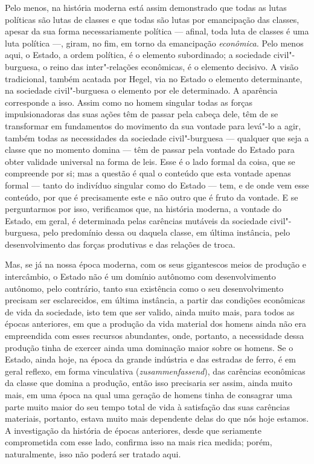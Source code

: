Pelo menos, na história moderna está assim demonstrado que todas as
lutas políticas são lutas de classes e que todas são lutas por
emancipação das classes, apesar da sua forma necessariamente política ---
afinal, toda luta de classes é uma luta política ---, giram, no fim, em
torno da emancipação \emph{econômica. }Pelo menos aqui, o Estado, a
ordem política, é o elemento subordinado; a sociedade civil"-burguesa, o
reino das inter"-relações econômicas, é o elemento decisivo. A visão
tradicional, também acatada por Hegel, via no Estado o elemento
determinante, na sociedade civil"-burguesa o elemento por ele
determinado. A aparência corresponde a isso. Assim como no homem
singular todas as forças impulsionadoras das suas ações têm de passar
pela cabeça dele, têm de se transformar em fundamentos do movimento da
sua vontade para levá"-lo a agir, também todas as necessidades da
sociedade civil"-burguesa --- qualquer que seja a classe que no momento
domina --- têm de passar pela vontade do Estado para obter validade
universal na forma de leis. Esse é o lado formal da coisa, que se
compreende por si; mas a questão é qual o conteúdo que esta vontade
apenas formal --- tanto do indivíduo singular como do Estado --- tem, e de
onde vem esse conteúdo, por que é precisamente este e não outro que é
fruto da vontade. E se perguntarmos por isso, verificamos que, na
história moderna, a vontade do Estado, em geral, é determinada pelas
carências mutáveis da sociedade civil"-burguesa, pelo predomínio dessa ou
daquela classe, em última instância, pelo desenvolvimento das forças
produtivas e das relações de troca.

Mas, se já na nossa época moderna, com os seus gigantescos meios de
produção e intercâmbio, o Estado não é um domínio autônomo com
desenvolvimento autônomo, pelo contrário, tanto sua existência como o
seu desenvolvimento precisam ser esclarecidos, em última instância, a
partir das condições econômicas de vida da sociedade, isto tem que ser
valido, ainda muito mais, para todos as épocas anteriores, em que a
produção da vida material dos homens ainda não era empreendida com esses
recursos abundantes, onde, portanto, a necessidade dessa produção tinha
de exercer ainda uma dominação maior sobre os homens. Se o Estado, ainda
hoje, na época da grande indústria e das estradas de ferro, é em geral
reflexo, em forma vinculativa (\emph{zusammenfassend}), das carências
econômicas da classe que domina a produção, então isso precisaria ser
assim, ainda muito mais, em uma época na qual uma geração de homens
tinha de consagrar uma parte muito maior do seu tempo total de vida à
satisfação das suas carências materiais, portanto, estava muito mais
dependente delas do que nós hoje estamos. A investigação da história de
épocas anteriores, desde que seriamente comprometida com esse lado,
confirma isso na mais rica medida; porém, naturalmente, isso não poderá
ser tratado aqui.

